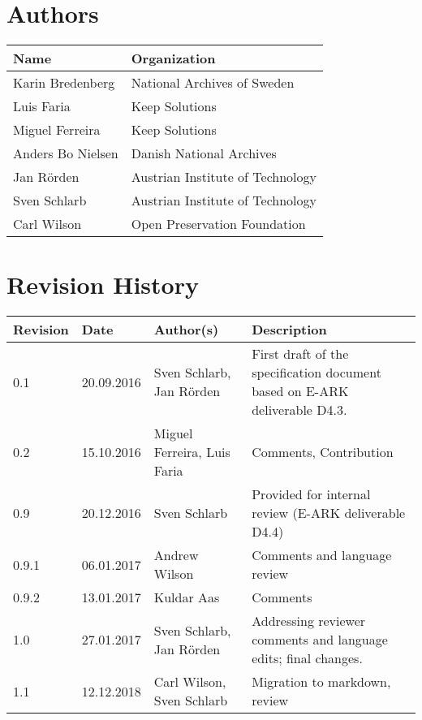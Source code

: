 \pagebreak

\section*{Authors}

\begin{tabular}{|p{6cm}|p{9cm}|}
\hline
\textbf{Name}     & \textbf{Organization}            \\
\hline
Karin Bredenberg  & National Archives of Sweden      \\
\hline
Luis Faria        & Keep Solutions                   \\
\hline
Miguel Ferreira   & Keep Solutions                   \\
\hline
Anders Bo Nielsen & Danish National Archives         \\
\hline
Jan Rörden        & Austrian Institute of Technology \\
\hline
Sven Schlarb      & Austrian Institute of Technology \\
\hline
Carl Wilson       & Open Preservation Foundation    \\
\hline
\end{tabular}


\pagebreak

\section*{Revision History}

\begin{tabular}{|p{}|p{}|p{4cm}|p{7cm}|}
\hline
\textbf{Revision} & \textbf{Date} & \textbf{Author(s)} & \textbf{Description}                                                  \\
\hline
0.1   & 20.09.2016 & Sven Schlarb, Jan Rörden     & First draft of the specification document based on E-ARK deliverable D4.3. \\
\hline
0.2   & 15.10.2016 & Miguel Ferreira, Luis Faria  & Comments, Contribution                                                     \\
\hline
0.9   & 20.12.2016 & Sven Schlarb                 & Provided for internal review (E-ARK deliverable D4.4)                      \\
\hline
0.9.1 & 06.01.2017 & Andrew Wilson                & Comments and language review                                               \\
\hline
0.9.2 & 13.01.2017 & Kuldar Aas                   & Comments                                                                   \\
\hline
1.0   & 27.01.2017 & Sven Schlarb, Jan Rörden     & Addressing reviewer comments and language edits; final changes.            \\ 
\hline
1.1   & 12.12.2018 & Carl Wilson, Sven Schlarb    & Migration to markdown, review                                              \\
\hline
\end{tabular}

\pagebreak



